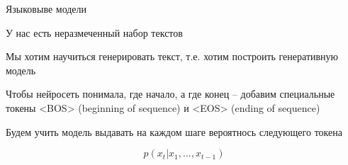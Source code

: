 \documentclass[notes,12pt, aspectratio=169]{beamer}
\newenvironment{wideitemize}{\itemize\addtolength{\itemsep}{10pt}}{\enditemize}
\begin{document}
\begin{frame}{Языковыве модели}
	\begin{wideitemize}
			\item  У нас есть неразмеченный набор текстов 
			
			\item  Мы хотим научиться генерировать текст, т.е. хотим построить генеративную модель 
			
			\item  Чтобы нейросеть понимала, где начало, а где конец -- добавим специальные токены <BOS> (beginning of sequence) и <EOS> (ending of sequence)
			
			\item Будем учить модель выдавать на каждом шаге вероятнось следующего токена 
			
			\[
			p(x_t | x_1, \dots, x_{t-1})
			\]
	\end{wideitemize}
\end{frame}
\end{document}
